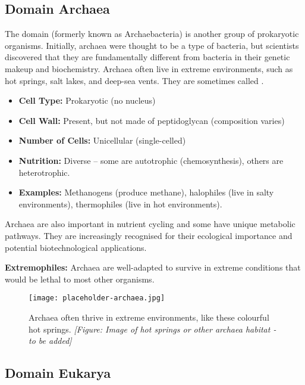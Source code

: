 \subsection{Domain Archaea}

The domain  (formerly known as Archaebacteria) is another group of prokaryotic organisms.  Initially, archaea were thought to be a type of bacteria, but scientists discovered that they are fundamentally different from bacteria in their genetic makeup and biochemistry.  Archaea often live in extreme environments, such as hot springs, salt lakes, and deep-sea vents. They are sometimes called .

\begin{itemize}
    \item \textbf{Cell Type:} Prokaryotic (no nucleus)
    \item \textbf{Cell Wall:} Present, but not made of peptidoglycan (composition varies)
    \item \textbf{Number of Cells:} Unicellular (single-celled)
    \item \textbf{Nutrition:} Diverse – some are autotrophic (chemosynthesis), others are heterotrophic.
    \item \textbf{Examples:} Methanogens (produce methane), halophiles (live in salty environments), thermophiles (live in hot environments).
\end{itemize}

Archaea are also important in nutrient cycling and some have unique metabolic pathways.  They are increasingly recognised for their ecological importance and potential biotechnological applications.

\begin{marginnote}
\textbf{Extremophiles:} Archaea are well-adapted to survive in extreme conditions that would be lethal to most other organisms.
\end{marginnote}

\begin{figure}
\centering
\texttt{[image: placeholder-archaea.jpg]}
\caption{Archaea often thrive in extreme environments, like these colourful hot springs. \textit{[Figure: Image of hot springs or other archaea habitat - to be added]}}
\end{figure}


\subsection{Domain Eukarya}

